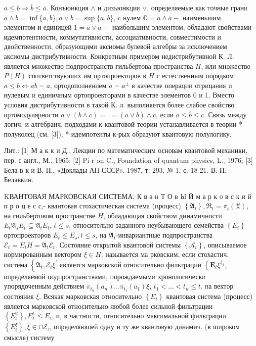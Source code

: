 \documentclass[10pt]{article}
\begin{document}
$a \leqslant b \Rightarrow \bar{b} \leqslant \bar{a}$. Конъюнкция $\wedge$ и дизъюнкция $\vee$, определяемые как точные грани $a \wedge b=\inf \{a, b\}, a \vee b=\sup \{a, b\}$, c нулем $\mathbb{O}=a \wedge \bar{a}-$ наименьшим элементом и единицей $1=a \vee \bar{a}-$ наибольшим элементом, обладают свойствами идемпотентности, коммутативности, ассоциативности, совместимости и двойственности, образующими аксиомы булевой алгебры за исключением аксиомы дистрибутивности. Конкретным примером недистрибутивной К. Л. является множество подпространств гильбертова пространства $H$, или множество $P(H)$ соответствуюших им ортопроекторов в $H$ с естественным порядком $a \leqslant b \Leftrightarrow a b=a$, ортодополнением $\bar{a}=a^{\perp}$ в качестве операции отрицания и нулевым и единичным ортопроекторами в качестве элементов 0 и 1. Вместо условия дистрибутивности в такой К. л. выполняется более слабое свойство ортомодулярности $a \vee(b \wedge c)=$ $=(a \vee b) \wedge c$, если $a \leqslant \bar{b} \leqslant c$. Связь между логич. и алгебраич. подходами к квантовой теории устанавливается в теории *-полуколец (см. [3]), *-идемпотенты к-рых образуют квантовую полулогику.



Лит.: [1] М а к к и Д., Лекции по математическим основам квантовой механики, пер. с англ., М., 1965; [2] Pi r on C., Foundation of quantum physics, L., 1976; [3] Бела в к и В. П., «Доклады АН СССР», 1987, т. 293, № 1, с. 18-21. В. П. Белавкин.



KВАНТОВАЯ МАРКОВСКАЯ СИСТЕМА, К в а н Т О в Ы Й м а р к о в с к и й п р о ц е с с,- квантовая стохастическая система (процесс) $\left\{\mathfrak{A}_{t}\right\}, \mathfrak{\Re}_{t}=\pi_{t}(\mathfrak{X})$, на гильбертовом пространстве $H$, обладающая свойством динамичности $E_{t} \mathfrak{A}_{s} E_{t} \subseteq \mathfrak{A}_{t} E_{t}$, $t \leqslant s$, относительно заданного неубывающего семейства $\left\{E_{t}\right\}$ ортопроекторов $E_{t} \leqslant E_{s}, t \leqslant s$, на $\mathfrak{A}_{t}$-инвариантные подпространства $\mathscr{E}_{t}=E_{t} H=\mathfrak{A}_{t} \mathscr{E}_{t}$. Состояние открытой квантовой системы $\left\{\mathfrak{\mathcal { A }}_{t}\right\}$, описываемое нормированным вектором $\xi \in H$, называется ма рковским, если стохастич. система $\left\{\mathfrak{A}_{t}, \mathscr{E}_{t} \xi^{\prime}\right.$ является марковской относительно фильтрации $\left\{\boldsymbol{E}_{t} \xi^{\xi_{1}}\right.$, определяемой подпространствами, порождаемыми хронологически упорядоченным действием $\pi_{t_{n}}\left(a_{n}\right) \ldots \pi_{t_{1}}\left(a_{1}\right) \xi$, $t_{1}<\ldots<t_{n} \leqslant t$, на вектор состояния $\xi$. Всякая марковская относительно $\left\{E_{t}\right\}$ квантовая система (процесс) является марковской относительно любой более сильной фильтрации $\left\{E_{t}^{2}\right\}, E_{t}^{1} \leqslant E_{t}$, и, в частности, относительно максимальной фильтрации $\left\{E_{t}^{\xi}\right\}, \xi \in \cap \mathscr{E}_{t}$, определяюшей одну и ту же квантовую динамич. (в широком смысле) систему
\end{document}
